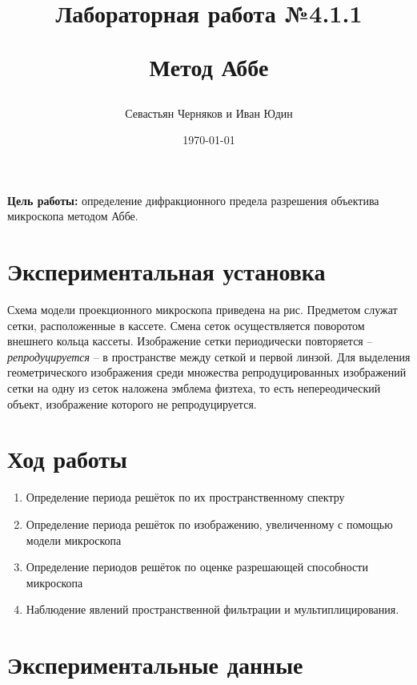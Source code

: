 \documentclass{article}
\title{\begin{center}Лабораторная работа №4.1.1\end{center}
Метод Аббе}
\author{Севастьян Черняков и Иван Юдин}
\date{\today}
\begin{document}
\maketitle
{}

  \maketitle

\textbf{Цель работы:} определение дифракционного предела разрешения объектива микроскопа методом Аббе.



\section{Экспериментальная установка}
  Схема модели проекционного микроскопа приведена на рис. Предметом служат сетки, расположенные в кассете. Смена сеток осуществляется поворотом внешнего кольца кассеты.
  Изображение сетки периодически повторяется -- \textit{репродуцируется} -- в пространстве между сеткой и первой линзой. Для выделения геометрического изображения среди множества репродуцированных изображений сетки на одну из сеток наложена эмблема физтеха, то есть непереодический объект, изображение которого не репродуцируется.
  
\section{Ход работы}
  \begin{enumerate}
    \item
      Определение периода решёток по их пространственному спектру
    \item 
      Определение периода решёток по изображению, увеличенному с помощью модели микроскопа
    \item
      Определение периодов решёток по оценке разрешающей способности микроскопа
    \item 
      Наблюдение явлений пространственной фильтрации и мультиплицирования.
  \end{enumerate}
\newpage
\section{Экспериментальные данные}
\end{document}
